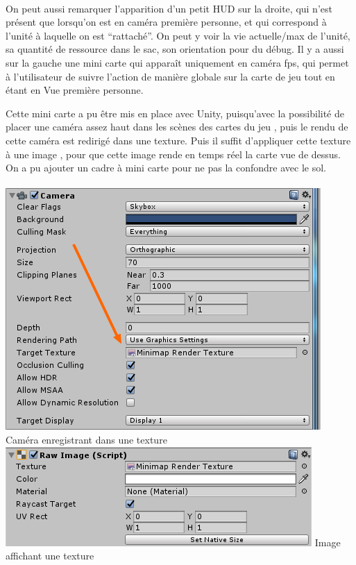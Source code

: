 \documentclass{report}
\begin{document}
\paragraph{}


On peut aussi remarquer l’apparition d’un petit HUD sur la droite, qui n’est présent que lorsqu’on est en caméra première personne, et qui correspond à l’unité à laquelle on est “rattaché”. On peut y voir la vie actuelle/max de l’unité, sa quantité de ressource dans le sac, son orientation pour du débug.
Il y a aussi sur la gauche une mini carte qui apparaît uniquement en caméra fps, qui permet à l’utilisateur de suivre l’action de manière globale sur la carte de jeu tout en étant en Vue première personne. 

Cette mini carte a pu être mis en place avec Unity, puisqu’avec la possibilité de placer une caméra assez haut dans les scènes des cartes du jeu , puis le rendu de cette caméra est redirigé dans une texture. Puis il suffit d’appliquer cette texture à une image , pour que cette image rende en temps réel la carte vue de dessus. 
On a pu ajouter un cadre à mini carte pour ne pas la confondre avec le sol. 

\paragraph{}
\begin{center}
\includegraphics[scale=0.6]{DATA/textureminimap.png}
 {Caméra enregistrant dans une texture}
\includegraphics[scale=0.7]{DATA/imageminimap.png}
 {Image affichant une texture}
\end{center}
\end{document}

